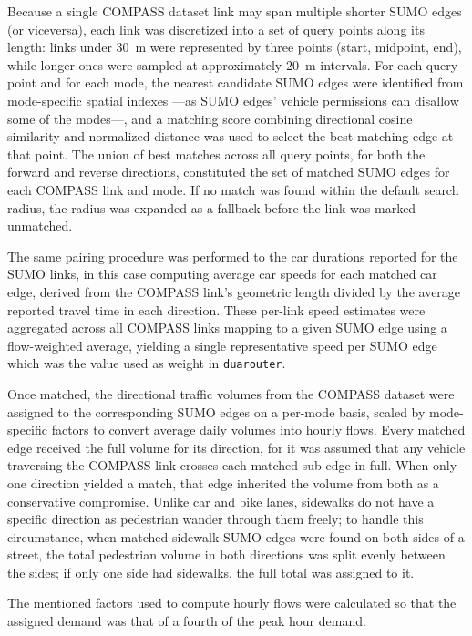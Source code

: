 Because a single COMPASS dataset link may span multiple shorter SUMO edges (or viceversa), each link was discretized into a set of query points along its length: links under 30~m were represented by three points (start, midpoint, end), while longer ones were sampled at approximately 20~m intervals. For each query point and for each mode, the nearest candidate SUMO edges were identified from mode-specific spatial indexes —as SUMO edges' vehicle permissions can disallow some of the modes—, and a matching score combining directional cosine similarity and normalized distance was used to select the best-matching edge at that point. The union of best matches across all query points, for both the forward and reverse directions, constituted the set of matched SUMO edges for each COMPASS link and mode. If no match was found within the default search radius, the radius was expanded as a fallback before the link was marked unmatched.

The same pairing procedure was performed to the car durations reported for the SUMO links, in this case computing average car speeds for each matched car edge, derived from the COMPASS link's geometric length divided by the average reported travel time in each direction. These per-link speed estimates were aggregated across all COMPASS links mapping to a given SUMO edge using a flow-weighted average, yielding a single representative speed per SUMO edge which was the value used as weight in \texttt{duarouter}.

Once matched, the directional traffic volumes from the COMPASS dataset were assigned to the corresponding SUMO edges on a per-mode basis, scaled by mode-specific factors to convert average daily volumes into hourly flows. Every matched edge received the full volume for its direction, for it was assumed that any vehicle traversing the COMPASS link crosses each matched sub-edge in full. When only one direction yielded a match, that edge inherited the volume from both as a conservative compromise. Unlike car and bike lanes, sidewalks do not have a specific direction as pedestrian wander through them freely; to handle this circumstance, when matched sidewalk SUMO edges were found on both sides of a street, the total pedestrian volume in both directions was split evenly between the sides; if only one side had sidewalks, the full total was assigned to it.

\medskip

\noindent The mentioned factors used to compute hourly flows were calculated so that the assigned demand was that of a fourth of the peak hour demand.

